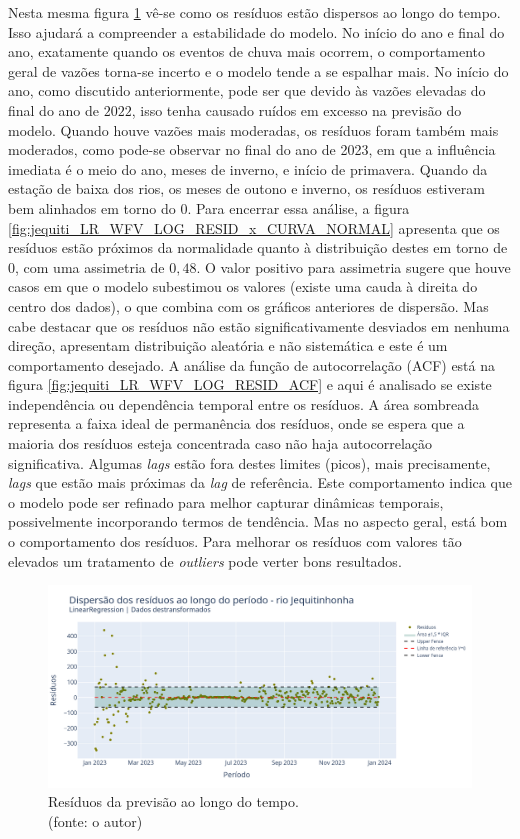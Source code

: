 Nesta mesma figura \ref{fig:jequiti_LR_WFV_LOG_RESID_x_TEMPO} vê-se como os resíduos estão dispersos ao longo do tempo. Isso ajudará a compreender a estabilidade do modelo. No início do ano e final do ano, exatamente quando os eventos de chuva mais ocorrem, o comportamento geral de vazões torna-se incerto e o modelo tende a se espalhar mais. No início do ano, como discutido anteriormente, pode ser que devido às vazões elevadas do final do ano de $2022$, isso tenha causado ruídos em excesso na previsão do modelo. Quando houve vazões mais moderadas, os resíduos foram também mais moderados, como pode-se observar no final do ano de 2023, em que a influência imediata é o meio do ano, meses de inverno, e início de primavera. Quando da estação de baixa dos rios, os meses de outono e inverno, os resíduos estiveram bem alinhados em torno do $0$. Para encerrar essa análise, a figura \ref{fig:jequiti_LR_WFV_LOG_RESID_x_CURVA_NORMAL} apresenta que os resíduos estão próximos da normalidade quanto à distribuição destes em torno de $0$, com uma assimetria de $0,48$. O valor positivo para assimetria sugere que houve casos em que o modelo subestimou os valores (existe uma cauda à direita do centro dos dados), o que combina com os gráficos anteriores de dispersão. Mas cabe destacar que os resíduos não estão significativamente desviados em nenhuma direção, apresentam distribuição aleatória e não sistemática e este é um comportamento desejado. A análise da função de autocorrelação (ACF) está na figura \ref{fig:jequiti_LR_WFV_LOG_RESID_ACF} e aqui é analisado se existe independência ou dependência temporal entre os resíduos. A área sombreada representa a faixa ideal de permanência dos resíduos, onde se espera que a maioria dos resíduos esteja concentrada caso não haja autocorrelação significativa. Algumas \textit{lags} estão fora destes limites (picos), mais precisamente, \textit{lags} que estão mais próximas da \textit{lag} de referência. Este comportamento indica que o modelo pode ser refinado para melhor capturar dinâmicas temporais, possivelmente incorporando termos de tendência. Mas no aspecto geral, está bom o comportamento dos resíduos. Para melhorar os resíduos com valores tão elevados um tratamento de \textit{outliers} pode verter bons resultados.

\begin{figure}[!h]
\centering
\includegraphics[scale=0.33]{Figuras/jequiti/wfv/LR/LR_WFV_LOG_RESID_x_TEMPO.png}
\caption{Resíduos da previsão ao longo do tempo.\\(fonte: o autor)}
\label{fig:jequiti_LR_WFV_LOG_RESID_x_TEMPO}
\end{figure}

